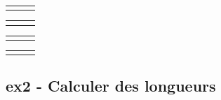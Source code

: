 \documentclass[11pt]{article}
\begin{document}
\begin{multicols}{4}

  \begin{center}
    \begin{tabular}{|c|c|c|}
      \hline
      \phantom{azer} &  \phantom{azer} &  \phantom{azer} \\  \hline
      &  & \\  \hline
    \end{tabular}
  \end{center}

  \begin{center}
    \begin{tabular}{|c|c|c|}
      \hline
      \phantom{azer} &  \phantom{azer} &  \phantom{azer} \\  \hline
      &  & \\  \hline
    \end{tabular}
  \end{center}

  \begin{center}
    \begin{tabular}{|c|c|c|}
      \hline
      \phantom{azer} &  \phantom{azer} &  \phantom{azer} \\  \hline
      &  & \\  \hline
    \end{tabular}
  \end{center}


  \begin{center}
    \begin{tabular}{|c|c|c|}
      \hline
      \phantom{azer} &  \phantom{azer} &  \phantom{azer} \\  \hline
      &  & \\  \hline
    \end{tabular}
  \end{center}

\end{multicols}


\subsection*{ex2 - Calculer des longueurs}
\end{document}
